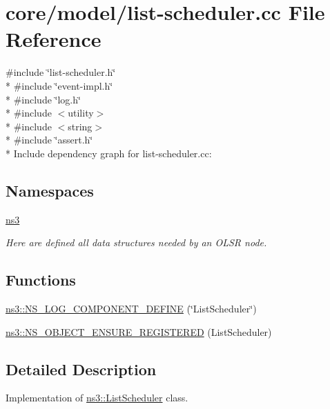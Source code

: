\hypertarget{list-scheduler_8cc}{}\section{core/model/list-\/scheduler.cc File Reference}
\label{list-scheduler_8cc}
{\ttfamily \#include \char`\"{}list-\/scheduler.\+h\char`\"{}}\\*
{\ttfamily \#include \char`\"{}event-\/impl.\+h\char`\"{}}\\*
{\ttfamily \#include \char`\"{}log.\+h\char`\"{}}\\*
{\ttfamily \#include $<$utility$>$}\\*
{\ttfamily \#include $<$string$>$}\\*
{\ttfamily \#include \char`\"{}assert.\+h\char`\"{}}\\*
Include dependency graph for list-\/scheduler.cc\+:
\subsection*{Namespaces}
\begin{DoxyCompactItemize}
\item 
 \hyperlink{namespacens3}{ns3}
\begin{DoxyCompactList}\small\item\em Here are defined all data structures needed by an O\+L\+SR node. \end{DoxyCompactList}\end{DoxyCompactItemize}
\subsection*{Functions}
\begin{DoxyCompactItemize}
\item 
\hyperlink{namespacens3_a81df0ba223e36874117ebc6791d764aa}{ns3\+::\+N\+S\+\_\+\+L\+O\+G\+\_\+\+C\+O\+M\+P\+O\+N\+E\+N\+T\+\_\+\+D\+E\+F\+I\+NE} (\char`\"{}List\+Scheduler\char`\"{})
\item 
\hyperlink{namespacens3_a21b798ffd76a0eca38b1bd6bc661f6a2}{ns3\+::\+N\+S\+\_\+\+O\+B\+J\+E\+C\+T\+\_\+\+E\+N\+S\+U\+R\+E\+\_\+\+R\+E\+G\+I\+S\+T\+E\+R\+ED} (List\+Scheduler)
\end{DoxyCompactItemize}


\subsection{Detailed Description}
Implementation of \hyperlink{classns3_1_1ListScheduler}{ns3\+::\+List\+Scheduler} class. 